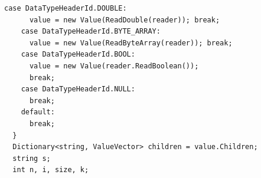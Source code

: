 \documentclass[12pt,a4paper]{article}
\begin{document}
\begin{appendices}
\begin{lstlisting}[caption={Sodep ReadValue method},label={lst:sodepReadValue}]
    case DataTypeHeaderId.DOUBLE:                                                                                                                                                            
      value = new Value(ReadDouble(reader)); break;                                                                                                                                               
    case DataTypeHeaderId.BYTE_ARRAY:                                                                                                                                                        
      value = new Value(ReadByteArray(reader)); break;                                                                                                                                            
    case DataTypeHeaderId.BOOL:                                                                                                                                                              
      value = new Value(reader.ReadBoolean());                                                                                                                                             
      break;                                                                                                                                                                               
    case DataTypeHeaderId.NULL:                                                                                                                                                              
      break;
    default:                                                                                                                                                                                 
      break;                                                                                                                                                                               
  }                                                                                                                                                                                            
  Dictionary<string, ValueVector> children = value.Children;                                                                                                                                   
  string s;                                                                                                                                                                                    
  int n, i, size, k;                                                                                                                                                                           

\end{lstlisting}
\end{appendices}
\end{document}

